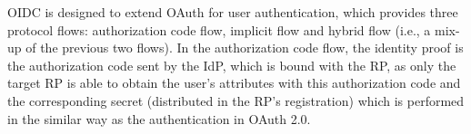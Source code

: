 

OIDC is designed to extend OAuth for user authentication,
 which provides three protocol flows: authorization code flow, implicit flow and hybrid flow (i.e., a mix-up of the previous two flows). In the authorization code flow, the identity proof is the authorization code sent by the IdP, which is bound with the RP, as only the target RP is able to obtain the user's attributes with this authorization code and the corresponding secret (distributed in the RP's registration) which is performed in the similar way as the authentication in OAuth 2.0.

